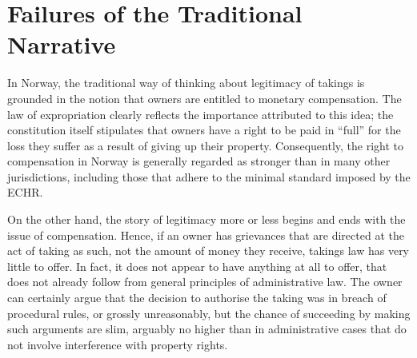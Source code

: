 

\section{Failures of the Traditional Narrative}

In Norway, the traditional way of thinking about legitimacy of takings is grounded in the notion that owners are entitled to monetary compensation. The law of expropriation clearly reflects the importance attributed to this idea; the constitution itself stipulates that owners have a right to be paid in ``full'' for the loss they suffer as a result of giving up their property. Consequently, the right to compensation in Norway is generally regarded as stronger than in many other jurisdictions, including those that adhere to the minimal standard imposed by the ECHR.

On the other hand, the story of legitimacy more or less begins and ends with the issue of compensation. Hence, if an owner has grievances that are directed at the act of taking as such, not the amount of money they receive, takings law has very little to offer. In fact, it does not appear to have anything at all to offer, that does not already follow from general principles of administrative law. The owner can certainly argue that the decision to authorise the taking was in breach of procedural rules, or grossly unreasonably, but the chance of succeeding by making such arguments are slim, arguably no higher than in administrative cases that do not involve interference with property rights.


